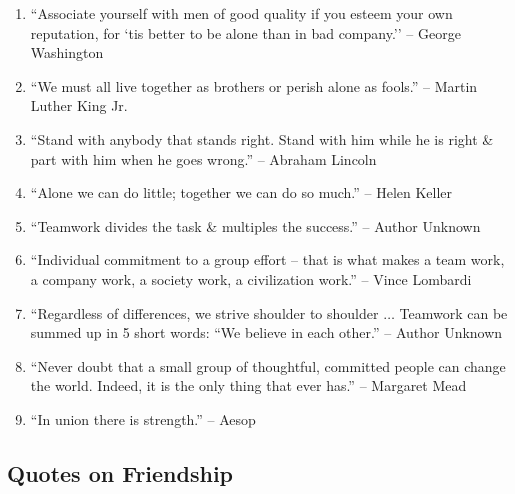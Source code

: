 \documentclass{article}
\begin{document}
\begin{enumerate}
	\item ``Associate yourself with men of good quality if you esteem your own reputation, for `tis better to be alone than in bad company.'' -- George Washington
	\item ``We must all live together as brothers or perish alone as fools.'' -- Martin Luther King Jr.
	\item ``Stand with anybody that stands right. Stand with him while he is right \& part with him when he goes wrong.'' -- Abraham Lincoln
	\item ``Alone we can do little; together we can do so much.'' -- Helen Keller
	\item ``Teamwork divides the task \& multiples the success.'' -- Author Unknown
	\item ``Individual commitment to a group effort -- that is what makes a team work, a company work, a society work, a civilization work.'' -- Vince Lombardi
	\item ``Regardless of differences, we strive shoulder to shoulder $\ldots$ Teamwork can be summed up in 5 short words: ``We believe in each other.'' -- Author Unknown
	\item ``Never doubt that a small group of thoughtful, committed people can change the world. Indeed, it is the only thing that ever has.'' -- Margaret Mead
	\item ``In union there is strength.'' -- Aesop
\end{enumerate}

\subsection{Quotes on Friendship}
\end{document}
